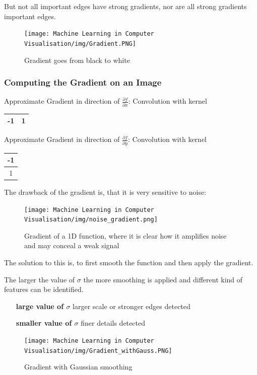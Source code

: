 \documentclass[x11names,11pt,a4paper]{article}
\theoremstyle{definition}
\begin{document}
But not all important edges have strong gradients, nor are all strong gradients important edges.

\begin{figure}[H]
	\centering
	\texttt{[image: Machine Learning in Computer Visualisation/img/Gradient.PNG]}
	\caption{Gradient goes from black to white}
	\label{fig:Gradient_verlauf}
\end{figure}

\subsubsection{Computing the Gradient on an Image}
Approximate Gradient in direction of $ \frac{\partial f}{\partial x} $: Convolution with kernel \begin{tabular}{|c|c|}
	\hline
	-1 & 1\\
	\hline
\end{tabular}

\noindent
Approximate Gradient in direction of $ \frac{\partial f}{\partial y} $: Convolution with kernel \begin{tabular}{|c|}
	\hline
	-1 \\
	\hline
	1\\
	\hline
\end{tabular}

The drawback of the gradient is, that it is very sensitive to noise:
\begin{figure}[H]
	\centering
	\texttt{[image: Machine Learning in Computer Visualisation/img/noise\_gradient.png]}
	\caption{Gradient of a 1D function, where it is clear how it amplifies noise and may conceal a weak signal}
	\label{fig:noisegradient}
\end{figure}

\noindent
The solution to this is, to first smooth the function and then apply the gradient.

The larger the value of $\sigma$ the more smoothing is applied and different kind of features can be identified.
\begin{itemize}[leftmargin=*, labelindent=3.5cm, labelsep=0.5cm]
	\item[\textbf{large value of $\sigma$}] larger scale or stronger edges detected
	\item[\textbf{smaller value of $\sigma$}] finer details detected
\end{itemize}

\begin{figure}[H]
	\centering
	\texttt{[image: Machine Learning in Computer Visualisation/img/Gradient\_withGauss.PNG]}
	\caption{Gradient with Gaussian smoothing}
	\label{fig:noisegradient-smoothed}
\end{figure}
\end{document}

